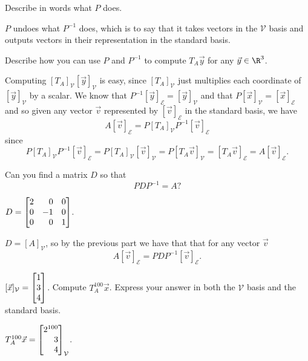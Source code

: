 \documentclass{problemset}
\begin{document}
	\begin{parts}
		\item Describe in words what $P$ does.
			\begin{solution}
				$P$ undoes what $P^{-1}$ does, which is to say that it takes vectors
				in the $\mathcal V$ basis and outputs vectors in their representation
				in the standard basis.
			\end{solution}
		\item Describe how you can use $P$ and $P^{-1}$ to compute
			$T_A\vec y$ for any $\vec y\in \R^3$.
			\begin{solution}
				Computing $[T_A]_{\mathcal V}[\vec y]_{\mathcal V}$ is easy, since
				$[T_A]_{\mathcal V}$ just multiplies each coordinate of $[\vec y]_{\mathcal V}$
				by a scalar. We know that $P^{-1}[\vec y]_{\mathcal E}=[\vec y]_{\mathcal V}$ 
				and that $P[\vec x]_{\mathcal V}=[\vec x]_{\mathcal E}$ and so 
				given any vector $\vec v$ represented by $[\vec v]_{\mathcal E}$
				in the standard basis, we have
				\[
					A[\vec v]_{\mathcal E}=P[T_A]_{\mathcal V}P^{-1}[\vec v]_{\mathcal E}
				\]
				since
				\[
					P[T_A]_{\mathcal V}P^{-1}[\vec v]_{\mathcal E}
					=P[T_A]_{\mathcal V}[\vec v]_{\mathcal V}
					=P[T_A\vec v]_{\mathcal V}
					=[T_A\vec v]_{\mathcal E}
					=A[\vec v]_{\mathcal E}.
				\]
			\end{solution}
		\item Can you find a matrix $D$ so that
			\[
				PDP^{-1}=A?
			\]
			\begin{solution}
				$D=\mat{2&0&0\\0&-1&0\\0&0&1}$.

				$D=[A]_{\mathcal V}$, so by the previous part we have that
				that for any vector $\vec v$
				\[
					A[\vec v]_{\mathcal E}=PDP^{-1}[\vec v]_{\mathcal E}.
				\]
			\end{solution}
		\item $[\vec x]_{\mathcal V}=\mat{1\\3\\4}$.  Compute $T_A^{100}\vec x$. Express
			your answer in both the $\mathcal V$ basis and the standard basis.
			\begin{solution}
				$T_A^{100}\vec x=\mat{2^{100}\\3\\4}_{\mathcal V}$.


\end{solution}
\end{parts}
\end{document}
